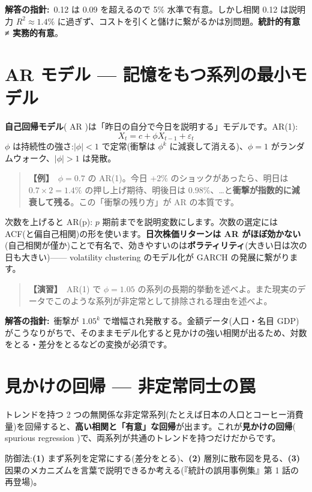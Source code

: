 \documentclass{article}
\begin{document}
\textbf{解答の指針:}\ 0.12 は 0.09 を超えるので 5\% 水準で有意。しかし相関 0.12 は説明力 \(R^2 \approx 1.4\%\) に過ぎず、コストを引くと儲けに繋がるかは別問題。\textbf{統計的有意 ≠ 実務的有意}。

\section{AR モデル — 記憶をもつ系列の最小モデル}

\textbf{自己回帰モデル}( AR )は「昨日の自分で今日を説明する」モデルです。AR(1):
\[ X_t = c + \phi X_{t-1} + \varepsilon_t \]
\(\phi\) は持続性の強さ:\(|\phi| < 1\) で定常(衝撃は \(\phi^k\) に減衰して消える)、\(\phi = 1\) がランダムウォーク、\(|\phi| > 1\) は発散。

\begin{quote}
\textbf{【例】}\ \(\phi = 0.7\) の AR(1)。今日 +2\% のショックがあったら、明日は \(0.7 \times 2 = 1.4\%\) の押し上げ期待、明後日は 0.98\%、…と\textbf{衝撃が指数的に減衰して残る}。この「衝撃の残り方」が AR の本質です。
\end{quote}

次数を上げると AR(p): \(p\) 期前までを説明変数にします。次数の選定には ACF(と偏自己相関)の形を使います。\textbf{日次株価リターンは AR がほぼ効かない}(自己相関が僅か)ことで有名で、効きやすいのは\textbf{ボラティリティ}(大きい日は次の日も大きい)—— volatility clustering のモデル化が GARCH の発展に繋がります。

\begin{quote}
\textbf{【演習】}\ AR(1) で \(\phi = 1.05\) の系列の長期的挙動を述べよ。また現実のデータでこのような系列が非定常として排除される理由を述べよ。
\end{quote}

\textbf{解答の指針:}\ 衝撃が \(1.05^k\) で増幅され発散する。金額データ(人口・名目 GDP)がこうなりがちで、そのままモデル化すると見かけの強い相関が出るため、対数をとる・差分をとるなどの変換が必須です。

\section{見かけの回帰 — 非定常同士の罠}

トレンドを持つ 2 つの無関係な非定常系列(たとえば日本の人口とコーヒー消費量)を回帰すると、\textbf{高い相関と「有意」な回帰}が出ます。これが\textbf{見かけの回帰}( spurious regression )で、両系列が共通のトレンドを持つだけだからです。

防御法:\textbf{(1)} まず系列を定常にする(差分をとる)、\textbf{(2)} 層別に散布図を見る、\textbf{(3)} 因果のメカニズムを言葉で説明できるか考える(『統計の誤用事例集』第 1 話の再登場)。
\end{document}
